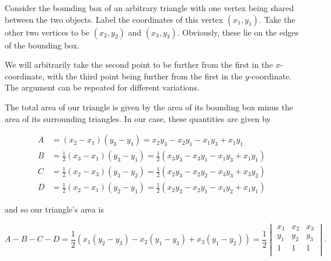 \documentclass[../group-theory-in-a-nutshell-for-physicists.tex]{subfiles}
\begin{document}
\begin{questions}
\begin{solution}
Consider the bounding box of an arbitrary triangle with one vertex being
shared between the two objects. Label the coordinates of this vertex
$(x_{1},y_{1})$. Take the other two vertices to be $(x_{2},y_{2})$
and $(x_{3},y_{3})$. Obviously, these lie on the edges of the bounding
box.

We will arbitrarily take the second point to be further from the first
in the $x$-coordinate, with the third point being further from the
first in the $y$-coordinate. The argument can be repeated for
different variations.

The total area of our triangle is given by the area of its bounding box
minus the area of its surrounding triangles. In our case, these
quantities are given by

\begin{align*}
A & = (x_{2} - x_{1})(y_{3} - y_{1}) = x_{2}y_{3} - x_{2}y_{1} - x_{1}y_{3} + x_{1}y_{1} \\
B & = \frac{1}{2}(x_{3} - x_{1})(y_{3} - y_{1}) = \frac{1}{2}(x_{3}y_{3} - x_{3}y_{1} - x_{1}y_{3} + x_{1}y_{1}) \\
C & = \frac{1}{2}(x_{2} - x_{3})(y_{3} - y_{2}) = \frac{1}{2}(x_{2}y_{3} - x_{2}y_{2} - x_{3}y_{3} + x_{3}y_{2}) \\
D & = \frac{1}{2}(x_{2} - x_{1})(y_{2} - y_{1}) = \frac{1}{2}(x_{2}y_{2} - x_{2}y_{1} - x_{1}y_{2} + x_{1}y_{1})
\end{align*}

and so our triangle's area is

\[A - B - C - D = \frac{1}{2}(x_{1}(y_{2} - y_{3}) - x_{2}(y_{1} - y_{3}) + x_{3}(y_{1} - y_{2})) = \frac{1}{2}\begin{vmatrix}
x_{1} & x_{2} & x_{3} \\
y_{1} & y_{2} & y_{3} \\
1 & 1 & 1 \\
\end{vmatrix}.\]
\end{solution}

\end{questions}
\end{document}
